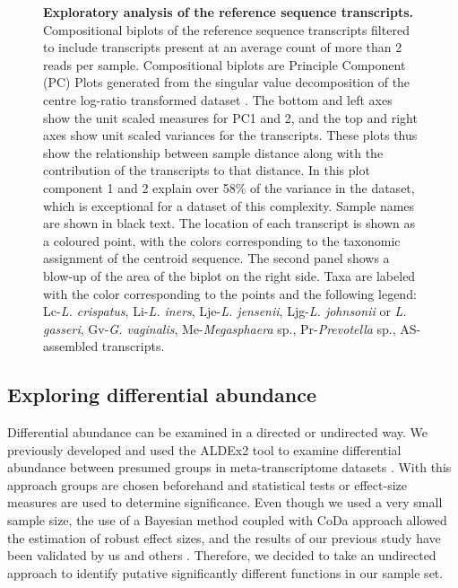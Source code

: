 \documentclass[10pt,letterpaper]{article}
\begin{document}
\begin{figure}[h]
\caption{{\bf Exploratory analysis of the reference sequence transcripts.}
Compositional biplots of the reference sequence transcripts filtered to include transcripts present at an average count of more than 2 reads per sample. Compositional biplots are Principle Component (PC) Plots generated from the singular value decomposition of the centre log-ratio transformed dataset \cite{aitchison2002biplots}. The bottom and left axes show the unit scaled measures for PC1 and 2, and the top and right axes show unit scaled variances for the transcripts. These plots thus show the relationship between sample distance along with the contribution of the transcripts to that distance. In this plot component 1 and 2 explain over 58\% of the variance in the dataset, which is exceptional for a dataset of this complexity. Sample names are shown in black text. The location of each transcript is shown as a coloured point, with the colors corresponding to the taxonomic assignment of the centroid sequence. The second panel shows a blow-up of the area of the biplot on the right side. Taxa are labeled with the  color corresponding to the points and the following legend: Lc-\emph{L. crispatus},  Li-\emph{L. iners},  Lje-\emph{L. jensenii}, Ljg-\emph{L. johnsonii} or \emph{L. gasseri}, Gv-\emph{G. vaginalis}, Me-\emph{Megasphaera} sp., Pr-\emph{Prevotella} sp., AS- assembled transcripts. }
\label{F1:refseq_biplot}
\end{figure}

\subsection{Exploring differential abundance}

Differential abundance can be examined in a directed or undirected way. We previously developed and used the ALDEx2 tool to examine differential abundance between presumed groups in meta-transcriptome datasets \cite{fernandes:2013, fernandes:2014}. With this approach groups are chosen beforehand and statistical tests or effect-size measures are used to determine significance. Even though we used a very small sample size, the use of a Bayesian method coupled with CoDa approach allowed the estimation of robust effect sizes, and the results of our previous study \cite{macklaim:2013} have been validated by us and others \cite{mcmillan:2015,nelson:2015vaginal}. Therefore, we decided to take an undirected approach to identify putative significantly different functions in our sample set. 
\end{document}
